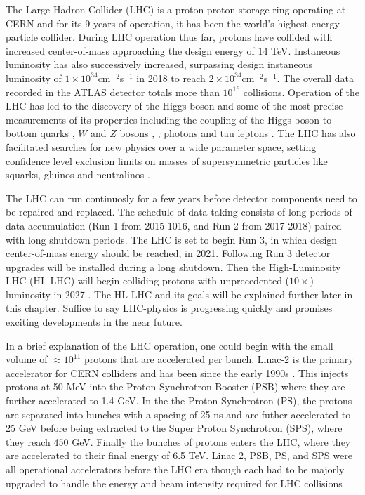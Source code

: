  
The Large Hadron Collider (LHC) is a proton-proton storage ring operating at CERN and for its 9 years of operation, it has been the world's highest energy particle collider. 
During LHC operation thus far, protons have collided with increased center-of-mass approaching the design energy of 14 TeV. Instaneous luminosity has also successively increased, surpassing design instaneous luminosity of $1\times10^{34}$cm$^{-2}$s$^{-1}$ in 2018 to reach $2\times10^{34}$cm$^{-2}$s$^{-1}$\cite{CERNnews1}. The overall data recorded in the ATLAS detector totals more than $10^{16}$ collisions. Operation of the LHC has led to the discovery of the Higgs boson and some of the most precise measurements of its properties including the coupling of the Higgs boson to bottom quarks \cite{Aaboud_2018_0}, $W$ and $Z$ bosons \cite{Aaboud_2019}, \cite{Aaboud_2018}, photons\cite{Aaboud_2018_2} and tau leptons \cite{Aaboud_2019_2}. The LHC has also facilitated searches for new physics over a wide parameter space, setting confidence level exclusion limits on masses of supersymmetric particles like squarks, gluinos and neutralinos \cite{ATLAS-CONF-2019-040}. 

The LHC can run continuosly for a few years before detector components need to be repaired and replaced. The schedule of data-taking consists of long periods of data accumulation (Run 1 from 2015-1016, and Run 2 from 2017-2018) paired with long shutdown periods. The LHC is set to begin Run 3, in which design center-of-mass energy should be reached, in 2021. Following Run 3 detector upgrades will be installed during a long shutdown. Then the High-Luminosity LHC (HL-LHC) will begin colliding protons with unprecedented ($10\times$) luminosity in 2027 \cite{CERNnews2}. The HL-LHC and its goals will be explained further later in this chapter. Suffice to say LHC-physics is progressing quickly and promises exciting developments in the near future. 

In a brief explanation of the LHC operation, one could begin with the small volume of $\approx 10^{11}$ protons that are accelerated per bunch. Linac-2 is the primary accelerator for CERN colliders and has been since the early 1990s \cite{LHCInjector}. This injects protons at 50 MeV into the Proton Synchrotron Booster (PSB) where they are further accelerated to 1.4 GeV. In the the Proton Synchrotron (PS), the protons are separated into bunches with a spacing of 25 ns and are futher accelerated to 25 GeV before being extracted to the Super Proton Synchrotron (SPS), where they reach 450 GeV. Finally the bunches of protons enters the LHC, where they are accelerated to their final energy of 6.5 TeV. Linac 2, PSB, PS, and SPS were all operational accelerators before the LHC era though each had to be majorly upgraded to handle the energy and beam intensity required for LHC collisions \cite{LHCInjector}. 

